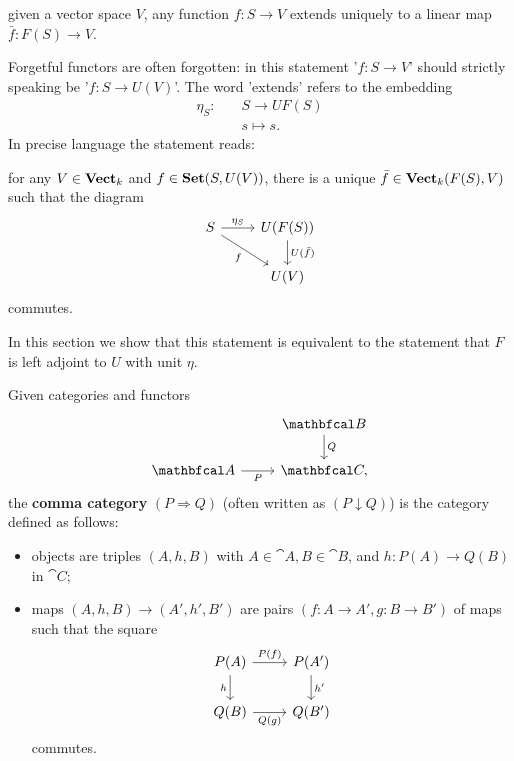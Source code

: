 \documentclass[11pt,a4paper]{article}
\begin{document}
\bigskip\noindent given a vector space $V$, any function $f:S\to V$ extends uniquely to a linear map $\bar{f}:F(S)\to V$.\par

\bigskip Forgetful functors are often forgotten: in this statement '$f:S\to V$' should strictly speaking be '$f:S\to U(V)$'. The word 'extends' refers to the embedding
\begin{align*}
    \eta_S:\quad & S\to UF(S)\\
            & s\mapsto s.
\end{align*}
In precise language the statement reads:\par\bigskip

    for any $V\in\mathbf{Vect}_k$ and $f\in\mathbf{Set}(S,U(V))$, there is a unique $\bar{f}\in\mathbf{Vect}_k(F(S),V)$ such that the diagram
    \begin{equation}\label{eq:third_adj_def}
    \begin{tikzcd}
        S \arrow[r, "\eta_S"] \arrow[dr, "f"'] & U(F(S)) \arrow[d, "U(\bar{f})"] \\
                                              & U(V)
    \end{tikzcd}
    \end{equation}
    commutes.\par\bigskip

In this section we show that this statement is equivalent to the statement that $F$ is left adjoint to $U$ with unit $\eta$.

\begin{definition}
    Given categories and functors
    \begin{equation*}
    \begin{tikzcd}
        & \cat{B} \arrow[d, "Q"]\\
        \cat{A} \arrow[r, "P"'] & \cat{C},
    \end{tikzcd}
    \end{equation*}
    the \textbf{comma category} $(P\Rightarrow Q)$ (often written as $(P\downarrow Q)$) is the category defined as follows:
    \begin{itemize}
        \item objects are triples $(A,h,B)$ with $A\in\cat{A}, B\in\cat{B}$, and $h: P(A)\to Q(B)$ in $\cat{C}$;
        \item maps $(A,h,B)\to (A',h',B')$ are pairs $(f:A\to A', g:B\to B')$ of maps such that the square
            \begin{equation*}
            \begin{tikzcd}
                P(A) \arrow[r, "P(f)"] \arrow[d, "h"'] & P(A') \arrow[d, "h'"] \\
                Q(B) \arrow[r, "Q(g)"'] & Q(B')
            \end{tikzcd}
            \end{equation*}
            commutes.
    \end{itemize}
\end{definition}
\end{document}
